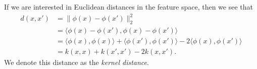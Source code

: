 \documentclass[preprint,12pt]{article}
\newcommand{\cm}[1]{\textit{{\color{blue}#1}}}
\begin{document}
If we are interested in Euclidean distances in the feature space, then we see that
\begin{align*}
    d(x,x')
        &= \| \phi(x) - \phi(x') \|_2^2 \\ 
        &= \langle\phi(x) - \phi(x'), \phi(x) - \phi(x') \rangle \\
        &= \langle \phi(x), \phi(x) \rangle + \langle \phi(x'), \phi(x') \rangle - 2\langle \phi(x), \phi(x') \rangle \\
        &= k(x, x) + k(x', x') - 2k(x, x').
\end{align*}
We denote this distance as the \textit{kernel distance}.





\end{document}
